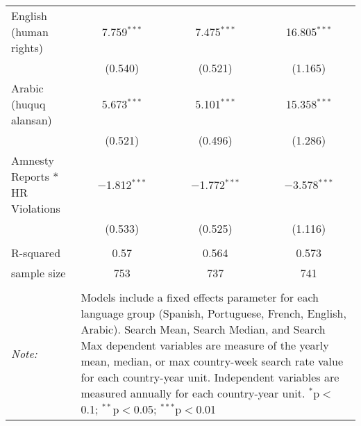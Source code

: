 \begin{table}[!htbp]
\begin{tabular}{@{\extracolsep{5pt}}lccc}
  English (human rights) & 7.759$^{***}$ & 7.475$^{***}$ & 16.805$^{***}$ \\ 
  & (0.540) & (0.521) & (1.165) \\ 
  Arabic (huquq alansan) & 5.673$^{***}$ & 5.101$^{***}$ & 15.358$^{***}$ \\ 
  & (0.521) & (0.496) & (1.286) \\ 
  Amnesty Reports * HR Violations & $-$1.812$^{***}$ & $-$1.772$^{***}$ & $-$3.578$^{***}$ \\ 
  & (0.533) & (0.525) & (1.116) \\ 
 \hline \\[-1.8ex] 
R-squared  & 0.57 & 0.564 & 0.573 \\ 
sample size  & 753 & 737 & 741 \\ 
\hline 
\hline \\[-1.8ex] 
\textit{Note:}  & \multicolumn{3}{l}{\parbox[t]{8cm}{Models include a fixed effects parameter for each language group (Spanish, Portuguese, French, English, Arabic). Search Mean, Search Median, and Search Max dependent variables are measure of the yearly mean, median, or max country-week search rate value for each country-year unit. Independent variables are measured annually for each country-year unit. $^{*}$p$<$0.1; $^{**}$p$<$0.05; $^{***}$p$<$0.01}} \\ 
\end{tabular} 
\end{table} 
